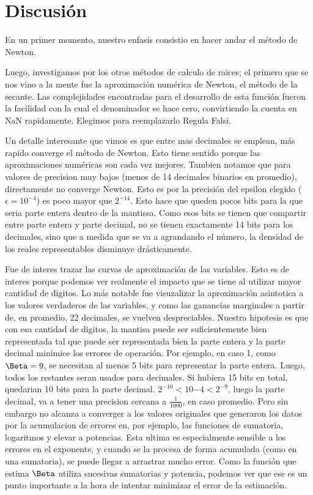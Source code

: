 \section{Discusi\'on}

En un primer momento, nuestro enfasis consistio en hacer andar el m\'etodo de Newton.


Luego, investigamos por los otros m\'etodos de calculo de raices; el primero que se nos vino a la mente
fue la aproximaci\'on num\'erica de Newton, el m\'etodo de la secante.
Las complejidades encontradas para el desarrollo de esta funci\'on fueron la facilidad con la cual
el denominador se hace cero, convirtiendo la cuenta en NaN rapidamente. Elegimos para reemplazarlo
Regula Falsi.


Un detalle interesante que vimos es que entre mas decimales se emplean, m\'as rapido converge el m\'etodo de Newton. 
Esto tiene sentido porque las aproximaciones num\'ericas son cada vez mejores. 
Tambien notamos que para valores de precision muy bajos (menos de 14 decimales binarios en promedio), directamente no converge Newton. 
Esto es por la precisi\'on del epsilon elegido ($\epsilon = 10^{-4}$) es poco mayor que $2^{-14}$. Esto hace que queden pocos bits para la que seria
parte entera dentro de la mantissa. Como esos bits se tienen que compartir entre parte entera y parte decimal, no se tienen exactamente
14 bits para los decimales, sino que a medida que se va a agrandando el n\'umero, la densidad de los reales representables disminuye dr\'asticamente.


Fue de interes trazar las curvas de aproximaci\'on de las variables. Esto es de interes porque podemos ver 
realmente el impacto que se tiene al utilizar mayor cantidad de digitos. Lo m\'as notable fue visuzalizar la 
aproximaci\'on asintotica a los valores verdaderos de las variables, y como las ganancias marginales a partir de,
en promedio, 22 decimales, se vuelven despreciables. Nuestra hipotesis es que con esa cantidad de digitos, la mantisa
puede ser suficientemente bien representada tal que puede ser representada bien la parte entera y la parte decimal 
minimice los errores de operaci\'on. Por ejemplo, en caso 1, como $\Beta = 9$, se necesitan al menos 5 bits para representar la parte entera.
Luego, todos los restantes seran usados para decimales. Si hubiera 15 bits en total, quedarian 10 bits para la parte decimal. $2^{-10}<10{-4}<2^{-9}$, luego
la parte decimal, va a tener una precision cercana a $\frac{1}{1000}$, en caso promedio. Pero sin embargo no alcanza
a converger a los valores originales que generaron los datos por la acumulacion de errores en, por ejemplo, las funciones
de sumatoria, logaritmos y elevar a potencias. Esta ultima es especialmente sensible a los errores en el exponente, y cuando 
se la procesa de forma acumulada (como en una sumatoria), se puede llegar a arrastrar mucho error. Como la funci\'on que estima
$\Beta$ utiliza sucesivas sumatorias y potencia, podemos ver que ese es un punto importante a la hora de intentar minimizar el error de 
la estimaci\'on.
